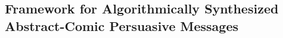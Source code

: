 

 \subsection{Framework for Algorithmically Synthesized Abstract-Comic Persuasive Messages}
 \label{sub:framework}
 
